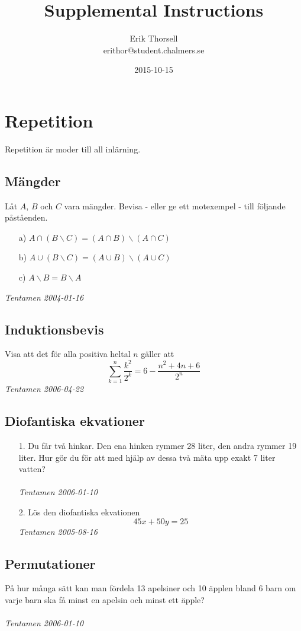 \documentclass{article}
\title{Supplemental Instructions}
\author{Erik Thorsell \\ 
		\small{erithor@student.chalmers.se}
}
\date{2015-10-15}
\begin{document}
\maketitle


\section*{Repetition}
Repetition är moder till all inlärning.

\subsection*{Mängder}
Låt $A$, $B$ och $C$ vara mängder. Bevisa - eller ge ett motexempel - till 
följande påståenden.
\begin{itemize}
\item[a)] $A \cap (B \backslash C) = (A \cap B) \backslash (A \cap C)$
\item[b)] $A \cup (B \backslash C) = (A \cup B) \backslash (A \cup C)$
\item[c)] $A \backslash B = B \backslash A$
\end{itemize}
{\it Tentamen 2004-01-16}

\subsection*{Induktionsbevis}
Visa att det för alla positiva heltal $n$ gäller att 
$$\sum_{k=1}^{n} \frac{k^2}{2^k} = 6 - \frac{n^2+4n+6}{2^n}$$
{\it Tentamen 2006-04-22}


\subsection*{Diofantiska ekvationer}
\begin{itemize}
\item[1.] 
Du får två hinkar. Den ena hinken rymmer 28 liter, den andra rymmer 19 liter.
Hur gör du för att med hjälp av dessa två mäta upp exakt 7 liter vatten?\\
\\
{\it Tentamen 2006-01-10}

\item[2.]
Lös den diofantiska ekvationen $$45x+50y=25$$
{\it Tentamen 2005-08-16}
\end{itemize}

\subsection*{Permutationer}
På hur många sätt kan man fördela 13 apelsiner och 10 äpplen bland 6 barn 
om varje barn ska få minst en apelsin och minst ett äpple?\\
\\
{\it Tentamen 2006-01-10}
\end{document}
